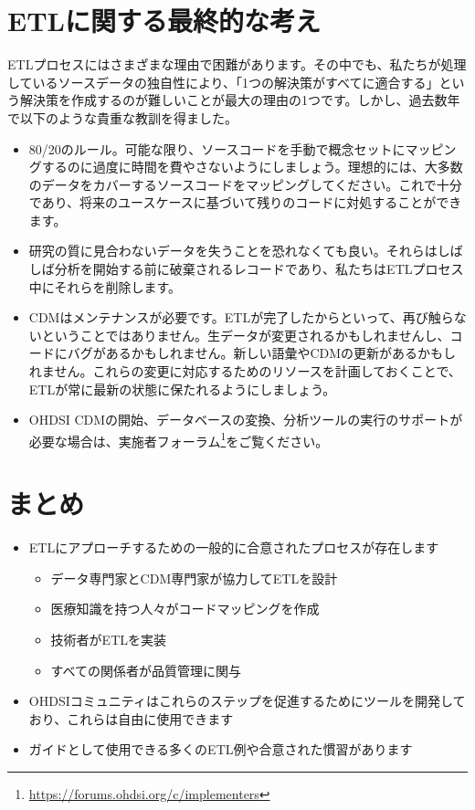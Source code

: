 \documentclass[
  11pt]{book}
\makeatletter
\providecommand{\tightlist}{%
  \setlength{\itemsep}{0pt}\setlength{\parskip}{0pt}}
\newenvironment{kframe}{%
\medskip{}
\setlength{\fboxsep}{.8em}
 \def\at@end@of@kframe{}%
 \ifinner\ifhmode%
  \def\at@end@of@kframe{\end{minipage}}%
  \begin{minipage}{\columnwidth}%
 \fi\fi%
 \def\FrameCommand##1{\hskip\@totalleftmargin \hskip-\fboxsep
 \colorbox{myShadeColor}{##1}\hskip-\fboxsep
     \hskip-\linewidth \hskip-\@totalleftmargin \hskip\columnwidth}%
 \MakeFramed {\advance\hsize-\width
   \@totalleftmargin\z@ \linewidth\hsize
   \@setminipage}}%
 {\par\unskip\endMakeFramed%
 \at@end@of@kframe}
\newenvironment{rmdblock}[1]
  {
  \begin{itemize}
  \renewcommand{\labelitemi}{
    \raisebox{-.7\height}[0pt][0pt]{
      {\setkeys{Gin}{width=3em,keepaspectratio}\texttt{[image: images/\#1]}}
    }
  }
  \setlength{\fboxsep}{1em}
  \begin{kframe}
  \item
  }
  {
  \end{kframe}
  \end{itemize}
  }
\newenvironment{rmdsummary}
  {\begin{rmdblock}{summary}}
  {\end{rmdblock}}
\theoremstyle{definition}
\theoremstyle{definition}
\theoremstyle{definition}
\theoremstyle{definition}
\theoremstyle{remark}
\makeatother
\begin{document}
\section{ETLに関する最終的な考え}\label{etlux306bux95a2ux3059ux308bux6700ux7d42ux7684ux306aux8003ux3048}

ETLプロセスにはさまざまな理由で困難があります。その中でも、私たちが処理しているソースデータの独自性により、「1つの解決策がすべてに適合する」という解決策を作成するのが難しいことが最大の理由の1つです。しかし、過去数年で以下のような貴重な教訓を得ました。

\begin{itemize}
\tightlist
\item
  80/20のルール。可能な限り、ソースコードを手動で概念セットにマッピングするのに過度に時間を費やさないようにしましょう。理想的には、大多数のデータをカバーするソースコードをマッピングしてください。これで十分であり、将来のユースケースに基づいて残りのコードに対処することができます。
\item
  研究の質に見合わないデータを失うことを恐れなくても良い。それらはしばしば分析を開始する前に破棄されるレコードであり、私たちはETLプロセス中にそれらを削除します。
\item
  CDMはメンテナンスが必要です。ETLが完了したからといって、再び触らないということではありません。生データが変更されるかもしれませんし、コードにバグがあるかもしれません。新しい語彙やCDMの更新があるかもしれません。これらの変更に対応するためのリソースを計画しておくことで、ETLが常に最新の状態に保たれるようにしましょう。
\item
  OHDSI CDMの開始、データベースの変換、分析ツールの実行のサポートが必要な場合は、実施者フォーラム\footnote{\url{https://forums.ohdsi.org/c/implementers}}をご覧ください。
\end{itemize}

\section{まとめ}\label{ux307eux3068ux3081-4}

\begin{rmdsummary}
\begin{itemize}
\item
  ETLにアプローチするための一般的に合意されたプロセスが存在します

  \begin{itemize}
  \tightlist
  \item
    データ専門家とCDM専門家が協力してETLを設計
  \item
    医療知識を持つ人々がコードマッピングを作成
  \item
    技術者がETLを実装
  \item
    すべての関係者が品質管理に関与
  \end{itemize}
\item
  OHDSIコミュニティはこれらのステップを促進するためにツールを開発しており、これらは自由に使用できます
\item
  ガイドとして使用できる多くのETL例や合意された慣習があります
\end{itemize}
\end{rmdsummary}
\end{document}
